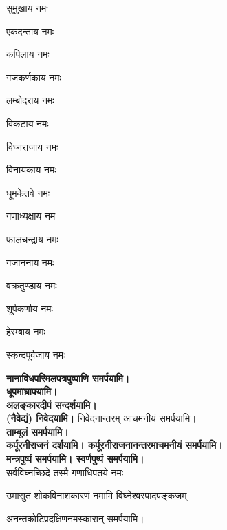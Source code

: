 \begin{enumerate}
\begin{minipage}{0.475\linewidth}   
  \item सुमुखाय नमः
  \item एकदन्ताय नमः
  \item कपिलाय नमः
  \item गजकर्णकाय नमः
  \item लम्बोदराय नमः
  \item विकटाय नमः
  \item विघ्नराजाय नमः
  \item विनायकाय नमः
\end{minipage}
\begin{minipage}{0.525\linewidth}
  \item धूमकेतवे नमः
  \item गणाध्यक्षाय नमः
  \item फालचन्द्राय नमः
  \item गजाननाय नमः
  \item वक्रतुण्डाय नमः
  \item शूर्पकर्णाय नमः
  \item हेरम्बाय नमः
  \item स्कन्दपूर्वजाय नमः
\end{minipage}
\end{enumerate}
\textbf{\devAya{} नानाविधपरिमलपत्रपुष्पाणि समर्पयामि।}\\
\textbf{\devAya{} धूपमाघ्रापयामि।}\\
\textbf{\devAya{} अलङ्कारदीपं सन्दर्शयामि।}\\
\textbf{\devAya{} \blank{} (नैवेद्यं) निवेदयामि।}
निवेदनान्तरम् आचमनीयं समर्पयामि।\\
\textbf{\devAya{} ताम्बूलं समर्पयामि।}\\
\textbf{\devAya{} कर्पूरनीराजनं दर्शयामि। कर्पूरनीराजनानन्तरमाचमनीयं समर्पयामि।}\\
\textbf{\devAya{} मन्त्रपुष्पं समर्पयामि। स्वर्णपुष्पं समर्पयामि।}\\

{सर्वविघ्नच्छिदे तस्मै गणाधिपतये नमः}

{उमासुतं शोकविनाशकारणं नमामि विघ्नेश्वरपादपङ्कजम्}

\centerline{अनन्तकोटिप्रदक्षिणनमस्कारान् समर्पयामि।}


